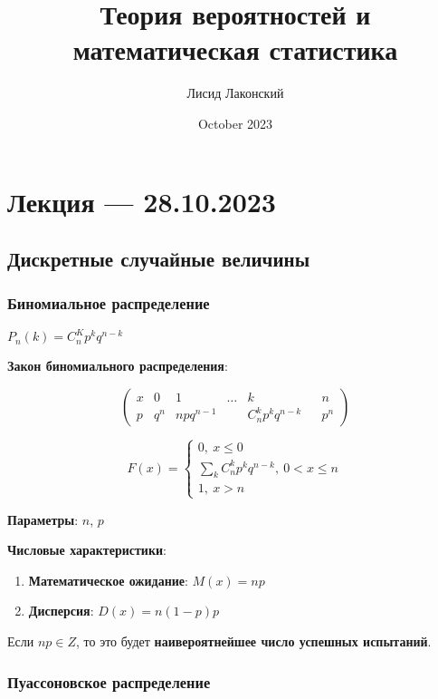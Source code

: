 \documentclass{article}
\title{Теория вероятностей и математическая статистика}
\author{Лисид Лаконский}
\date{October 2023}
\begin{document}
\raggedright

\maketitle

\tableofcontents
\pagebreak

\section{Лекция — 28.10.2023}

\subsection{Дискретные случайные величины}

\subsubsection{Биномиальное распределение}

$P_n(k) = C_n^K p^k q^{n - k}$

\textbf{Закон биномиального распределения}:

$$
\begin{pmatrix}
  x & 0 & 1 & \dots & k & & n \\
  p & q^{n} & n p q^{n - 1} & & C_n^k p^k q^{n - k} & & p^n
\end{pmatrix}
$$

$$
F(x) = \begin{cases}
    0, \ x \le 0 \\
    \sum\limits_{k} C_{n}^{k} p^{k} q^{n - k}, \ 0 < x \le n \\
    1, \ x > n
\end{cases}
$$

\textbf{Параметры}: $n$, $p$

\textbf{Числовые характеристики}:

\begin{enumerate}
    \item \textbf{Математическое ожидание}:
    $M(x) = np$
    \item \textbf{Дисперсия}:
    $D(x) = n(1-p)p$
\end{enumerate}

Если $np \in Z$, то это будет \textbf{наивероятнейшее число успешных испытаний}.

\subsubsection{Пуассоновское распределение}
\end{document}
